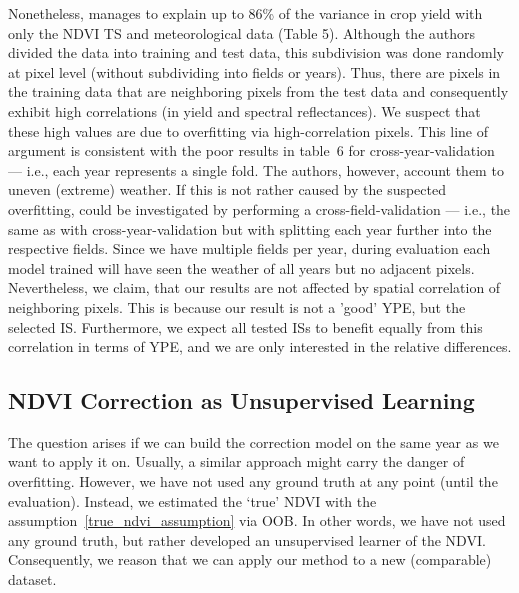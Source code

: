 {{        Nonetheless, \cite{perichPixelbasedCropYield2022} manages to explain up to 86\% of the variance in crop yield with only the NDVI TS and meteorological data (Table 5).  Although the authors divided the data into training and test data, this subdivision was done randomly at pixel level (without subdividing into fields or years). Thus, there are pixels in the training data that are neighboring pixels from the test data and consequently exhibit high correlations (in yield and spectral reflectances). We suspect that these high values are due to overfitting via high-correlation pixels. This line of argument is consistent with the poor results in table~6 for cross-year-validation --- i.e., each year represents a single fold. The authors, however, account them to uneven (extreme) weather.  If this is not rather caused by the suspected overfitting, could be investigated by performing a cross-field-validation --- i.e., the same as with cross-year-validation but with splitting each year further into the respective fields. Since we have multiple fields per year, during evaluation each model trained will have seen the weather of all years but no adjacent pixels.%
        Nevertheless, we claim, that our results are not affected by spatial correlation of neighboring pixels. This is because our result is not a 'good' YPE, but the selected IS. Furthermore, we expect all tested ISs to benefit equally from this correlation in terms of YPE, and we are only interested in the relative differences.  
    }

    \subsection{NDVI Correction as Unsupervised Learning}
        The question arises if we can build the correction model on the same year as we want to apply it on. Usually, a similar approach might carry the danger of overfitting. However, we have not used any ground truth at any point (until the evaluation). Instead, we estimated the `true' NDVI with the assumption~\ref{true_ndvi_assumption} via OOB. In other words, we have not used any ground truth, but rather developed an unsupervised learner of the NDVI. Consequently, we reason that we can apply our method to a new (comparable) dataset.
}
